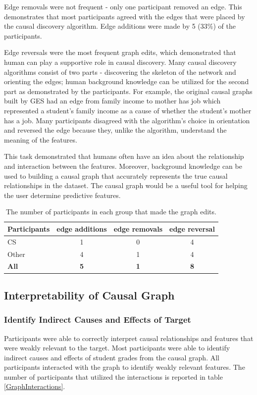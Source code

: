 Edge removals were not frequent - only one participant removed an edge. This demonstrates that most participants agreed with the edges that were placed by the causal discovery algorithm. Edge additions were made by 5 (33\%) of the participants.

Edge reversals were the most frequent graph edits, which demonstrated that human can play a supportive role in causal discovery. Many causal discovery algorithms consist of two parts - discovering the skeleton of the network and orienting the edges; human background knowledge can be utilized for the second part as demonstrated by the participants. For example, the original causal graphs built by GES had an edge from family income to mother has job which represented a student's family income as a cause of whether the student's mother has a job. Many participants disagreed with the algorithm's choice in orientation and reversed the edge because they, unlike the algorithm, understand the meaning of the features.

This task demonstrated that humans often have an idea about the relationship and interaction between the features. Moreover, background knowledge can be used to building a causal graph that accurately represents the true causal relationships in the dataset. The causal graph would be a useful tool for helping the user determine predictive features.

\begin{table}[]
\centering
\begin{tabular}{lccc}
\hline
Participants & edge additions & edge removals & edge reversal \\ \hline
CS           & 1             & 0              & 4           \\
Other        & 4             & 1            & 4             \\ \hline
\textbf{All} & \textbf{5}    & \textbf{1}  & \textbf{8}    \\ \hline
\end{tabular}
\caption {The number of participants in each group that made the graph edits.}
\label{graphedits}
\end{table}

\subsection { Interpretability of Causal Graph}
\subsubsection {Identify Indirect Causes and Effects of Target}
Participants were able to correctly interpret causal relationships and features that were weakly relevant to the target. Most participants were able to identify indirect causes and effects of student grades from the causal graph. All participants interacted with the graph to identify weakly relevant features. The number of participants that utilized the interactions is reported in table \ref{GraphInteractions}.

